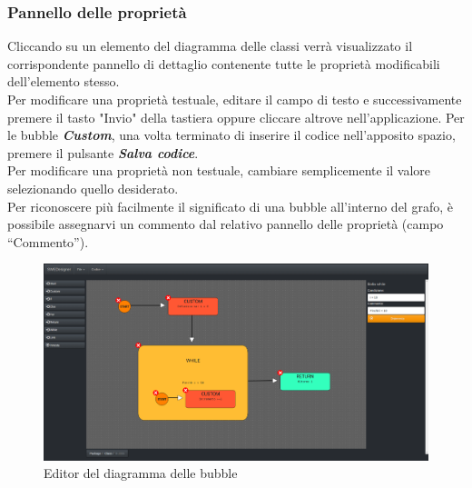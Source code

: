 \documentclass[../ManualeUtente.tex]{subfiles}
\begin{document}
			\subsubsection{Pannello delle proprietà}
				Cliccando su un elemento del diagramma delle classi verrà visualizzato il corrispondente pannello
				di dettaglio contenente tutte le proprietà modificabili dell'elemento stesso.\\
				Per modificare una proprietà testuale, editare il campo di testo e successivamente premere il
				tasto "Invio" della tastiera oppure cliccare altrove nell'applicazione. Per le bubble \textit{\textbf{Custom}}, una volta terminato di inserire il codice nell'apposito spazio, premere il pulsante \textit{\textbf{Salva codice}}.\\
				Per modificare una proprietà non testuale, cambiare semplicemente il valore selezionando quello
				desiderato.\\
				Per riconoscere più facilmente il significato di una bubble all'interno del grafo, è possibile
				assegnarvi un commento dal relativo pannello delle proprietà (campo ``Commento'').
			\begin{figure} [h!]
				\centering
				\includegraphics[scale=0.24]{./Immagini/BubbleDiagram.png}
				\caption{Editor del diagramma delle bubble}\label{fig:BubbleDiagram}
			\end{figure}
\end{document}
